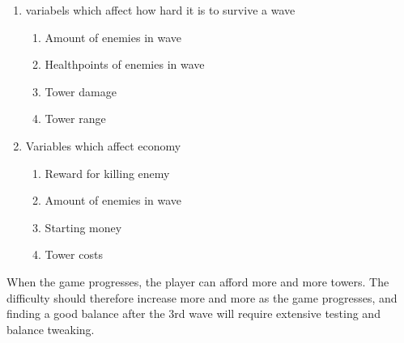 \begin{enumerate}
	\item variabels which affect how hard it is to survive a wave
	\begin{enumerate}
		\item Amount of enemies in wave
		\item Healthpoints of enemies in wave
		\item Tower damage
		\item Tower range
	\end{enumerate}
	\item Variables which affect economy
	\begin{enumerate}
		\item Reward for killing enemy
		\item Amount of enemies in wave
		\item Starting money
		\item Tower costs
	\end{enumerate}
\end{enumerate}

When the game progresses, the player can afford more and more towers. The difficulty should therefore increase more and more as the game progresses, and finding a good balance after the 3rd wave will require extensive testing and balance tweaking.


